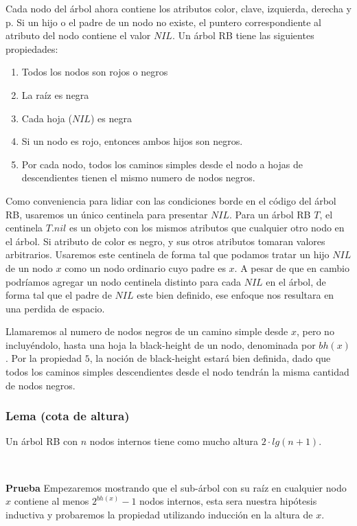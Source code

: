 Cada nodo del \'arbol ahora contiene los atributos color, clave, izquierda, derecha y p. Si un hijo o el padre de un nodo no existe, el puntero correspondiente al atributo del nodo contiene el valor $NIL$. Un \'arbol RB tiene las siguientes propiedades:

\begin{enumerate}
 \item Todos los nodos son rojos o negros
 \item La ra\'iz es negra
 \item Cada hoja ($NIL$) es negra
 \item Si un nodo es rojo, entonces ambos hijos son negros.
 \item Por cada nodo, todos los caminos simples desde el nodo a hojas de descendientes tienen el mismo numero de nodos negros.
\end{enumerate}

Como conveniencia para lidiar con las condiciones borde en el c\'odigo del \'arbol RB, usaremos un \'unico centinela para presentar $NIL$. Para un \'arbol RB $T$, el centinela $T.nil$ es un objeto con los mismos atributos que cualquier otro nodo en el \'arbol. Si atributo de color es negro, y sus otros atributos tomaran valores arbitrarios. Usaremos este centinela de forma tal que podamos tratar un hijo $NIL$ de un nodo $x$ como un nodo ordinario cuyo padre es $x$. A pesar de que en cambio podr\'iamos agregar un nodo centinela distinto para cada $NIL$ en el \'arbol, de forma tal que el padre de $NIL$ este bien definido, ese enfoque nos resultara en una perdida de espacio.

Llamaremos al numero de nodos negros de un camino simple desde $x$, pero no incluy\'endolo, hasta una hoja la black-height de un nodo, denominada por $bh(x)$. Por la propiedad $5$, la noci\'on de black-height estar\'a bien definida, dado que todos los caminos simples descendientes desde el nodo tendr\'an la misma cantidad de nodos negros.

\subsubsection{Lema (cota de altura)}
Un \'arbol RB con $n$ nodos internos tiene como mucho altura $2\cdot lg(n+1)$.

~

\textbf{Prueba} Empezaremos mostrando que el sub-\'arbol con su ra\'iz en cualquier nodo $x$ contiene al menos $2^{bh(x)}-1$ nodos internos, esta sera nuestra hip\'otesis inductiva y probaremos la propiedad utilizando inducci\'on en la altura de $x$. 

